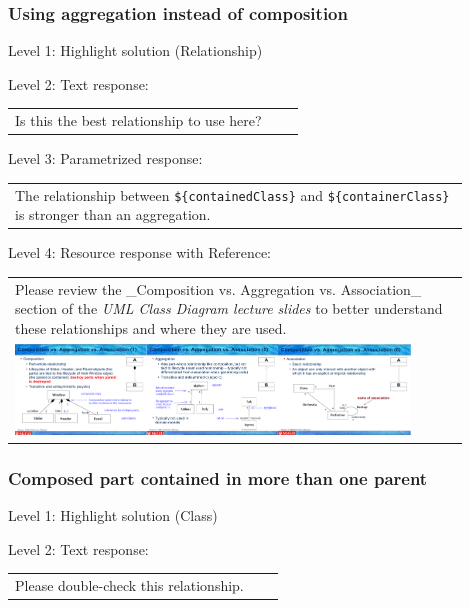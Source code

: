 \subsubsection{Using aggregation instead of composition}

\noindent Level 1: Highlight solution (Relationship) \medskip

\noindent Level 2: Text response: \medskip

\begin{tabular}{|p{0.9\linewidth}}
Is this the best relationship to use here?
\end{tabular} \medskip

\noindent Level 3: Parametrized response: \medskip

\begin{tabular}{|p{0.9\linewidth}}
The relationship between \verb|${containedClass}| and \verb|${containerClass}| is stronger than an aggregation.
\end{tabular} \medskip

\noindent Level 4: Resource response with Reference: \medskip

\begin{tabular}{|p{0.9\linewidth}}
Please review the _Composition vs. Aggregation vs. Association_ section of 
the \textit{UML Class Diagram lecture slides} to 
better understand these relationships and where they are used.

\\
\includegraphics[width=0.9\textwidth]{images/composition_aggregation_association.png}
\end{tabular} \medskip


\subsubsection{Composed part contained in more than one parent}

\noindent Level 1: Highlight solution (Class) \medskip

\noindent Level 2: Text response: \medskip

\begin{tabular}{|p{0.9\linewidth}}
Please double-check this relationship.
\end{tabular} \medskip

